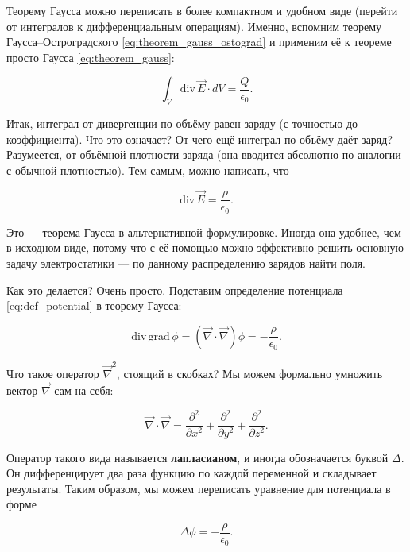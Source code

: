 \documentclass[12pt,a4paper]{article}
\numberwithin{equation}{section}
\numberwithin{equation}{section}
\newcommand{\pt}{\partial}
\newcommand{\grad}{\mathrm{grad}\,}
\renewcommand{\div}{\mathrm{div}\,}
\newcommand{\vn}{\vec{\nabla}}
\newcommand{\eps}{\epsilon}
\begin{document}
Теорему Гаусса можно переписать в более компактном и удобном виде
(перейти от интегралов к дифференциальным операциям). Именно, вспомним
теорему Гаусса--Остроградского \eqref{eq:theorem_gauss_ostograd} и
применим её к теореме просто Гаусса \eqref{eq:theorem_gauss}:

\begin{equation}
  \label{eq:statics_div_1}
  \int_V \div \vec{E} \cdot dV = \frac{Q}{\eps_0}.
\end{equation}

Итак, интеграл от дивергенции по объёму равен заряду (с точностью до
коэффициента). Что это означает? От чего ещё интеграл по объёму даёт
заряд? Разумеется, от объёмной плотности заряда (она вводится
абсолютно по аналогии с обычной плотностью). Тем самым, можно
написать, что 

\begin{equation}
  \label{eq:statics_div_2}
  \div \vec{E} = \frac{\rho}{\eps_0}.
\end{equation}

Это --- теорема Гаусса в альтернативной формулировке. Иногда она
удобнее, чем в исходном виде, потому что с её помощью можно эффективно
решить основную задачу электростатики --- по данному распределению
зарядов найти поля. 

Как это делается? Очень просто. Подставим определение потенциала
\eqref{eq:def_potential} в теорему Гаусса:

\begin{equation}
  \label{eq:poisson_1}
  \div \grad \phi =( \vn \cdot \vn) \phi =  -\frac{\rho}{\eps_0}. 
\end{equation}

Что такое оператор $\vn^2$, стоящий в скобках? Мы можем формально
умножить вектор $\vn$ сам на себя: 

\begin{equation}
  \label{eq:poisson_2}
  \vn \cdot \vn = \frac{\pt^2}{\pt x^2} + \frac{\pt^2}{\pt y^2} + \frac{\pt^2}{\pt z^2}.
\end{equation}

Оператор такого вида называется \textbf{лапласианом}, и иногда
обозначается буквой $\Delta$. Он дифференцирует два раза функцию по
каждой переменной и складывает результаты. Таким образом, мы можем
переписать уравнение для потенциала в форме

\begin{equation}
  \label{eq:poisson_3}
  \Delta \phi = -\frac{\rho}{\eps_0}.
\end{equation}
\end{document}
